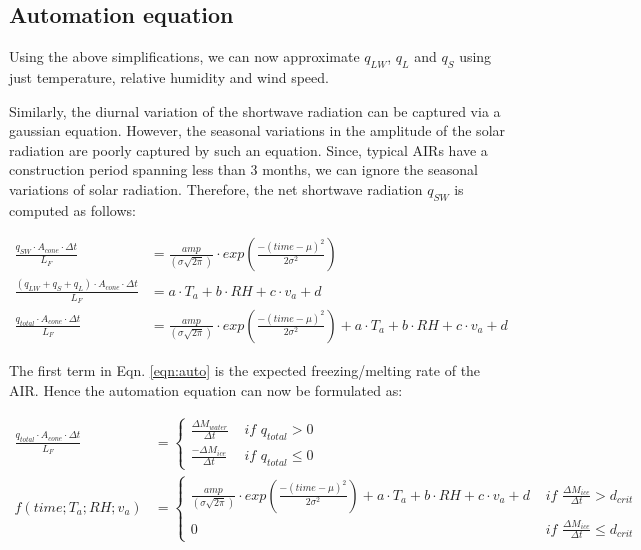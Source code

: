 \documentclass[utf8]{frontiersSCNS}
\begin{document}
\subsection{Automation equation}

Using the above simplifications, we can now approximate $q_{LW}$, $q_{L}$ and $q_{S}$ using just temperature,
relative humidity and wind speed. 

Similarly, the diurnal variation of the shortwave radiation can be captured via a gaussian equation. However,
the seasonal variations in the amplitude of the solar radiation are poorly captured by such an equation. Since,
typical AIRs have a construction period spanning less than 3 months, we can ignore the seasonal variations of
solar radiation. Therefore, the net shortwave radiation $q_{SW}$ is computed as follows: 


\begin{subequations}

	\begin{align}
		\label{eqn:SW}
    \frac{q_{SW} \cdot A_{cone} \cdot \Delta t}{L_F} & = \frac{amp}{(\sigma \sqrt{2\pi})} \cdot
    exp\left(\frac{-(time-\mu)^2}{2\sigma^2}\right) \\
		\label{eqn:T}
    \frac{(q_{LW} + q_{S} + q_{L}) \cdot A_{cone} \cdot \Delta t}{L_F} & = a \cdot T_a + b \cdot RH + c \cdot v_a +
  d \\
		\label{eqn:auto}
    \frac{q_{total} \cdot A_{cone} \cdot \Delta t}{L_F} & = \frac{amp}{(\sigma \sqrt{2\pi})} \cdot
    exp\left(\frac{-(time-\mu)^2}{2\sigma^2}\right) + a \cdot T_a + b \cdot RH + c \cdot v_a + d
	\end{align}
\end{subequations}

The first term in Eqn. \ref{eqn:auto} is the expected freezing/melting rate of the AIR. Hence the automation
equation can now be formulated as:

\begin{subequations}
	\begin{align}
		\label{eqn:SW}
  \frac{q_{total} \cdot A_{cone} \cdot \Delta t}{L_F} & = \left\{ \begin{array}{ll}
		\frac{\Delta M_{water}}{\Delta t} & \textit{ if } q_{total} > 0 \\
		\frac{-\Delta M_{ice}}{\Delta t} & \textit{ if } q_{total} \leq 0
	\end{array} \right. \\
  f(time;T_a;RH;v_a) & = \left\{ \begin{array}{ll}
		\frac{amp}{(\sigma \sqrt{2\pi})} \cdot
    exp\left(\frac{-(time-\mu)^2}{2\sigma^2}\right) + a \cdot T_a + b \cdot RH + c \cdot v_a + d
    & \textit{ if } \frac{\Delta M_{ice}}{\Delta t} > d_{crit} \\
		0 & \textit{ if } \frac{\Delta M_{ice}}{\Delta t} \leq d_{crit}
	\end{array} \right.
	\end{align}
\end{subequations}
\end{document}

